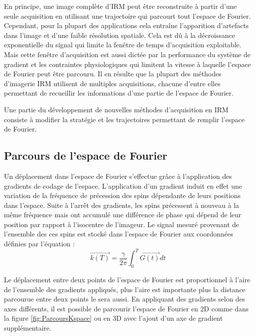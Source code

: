 En principe, une image complète d'IRM peut être reconstruite à partir d'une seule acquisition en utilisant une trajectoire qui  parcourt tout l'espace de Fourier. Cependant, pour la plupart des applications cela entraîne l'apparition d'artefacts dans l'image et d'une faible résolution spatiale. Cela est dû à la décroissance exponentielle du signal qui limite la fenêtre de temps d'acquisition exploitable. Mais cette fenêtre d'acquisition est aussi dictée par la performance du système de gradient et les contraintes physiologiques qui limitent la vitesse à laquelle l'espace de Fourier peut être parcouru. Il en résulte que la plupart des méthodes d'imagerie IRM utilisent de multiples acquisitions, chacune d'entre elles permettant de recueillir les informations d'une partie de l'espace de Fourier.

Une partie du développement de nouvelles méthodes d'acquisition en IRM consiste à modifier la stratégie et les trajectoires permettant de remplir l'espace de Fourier.


\subsection{Parcours de l'espace de Fourier}
\label{subsec:Parcours}

Un déplacement dans l'espace de Fourier s'effectue grâce à l'application des gradients de codage de l'espace. L'application d'un gradient induit en effet une variation de la fréquence de précession des spins dépendante de leurs positions dans l'espace. Suite à l'arrêt des gradients, les spins précessent à nouveau à la même fréquence mais ont accumulé une différence de phase qui dépend de leur position par rapport à l'isocentre de l'imageur. Le signal mesuré provenant de l'ensemble des ces spins est stocké dans l'espace de Fourier aux coordonnées définies par l'équation :
\begin{equation}
\overrightarrow{k(T)}= \frac{\gamma}{2\pi} \int_0^T \overrightarrow{G(t)}dt
\end{equation}

Le déplacement entre deux points de l'espace de Fourier est proportionnel à l'aire de l'ensemble des gradients appliqués, plus l'aire est importante plus la distance parcourue entre deux points le sera aussi. En appliquant des gradients selon des axes différents, il est possible de parcourir l'espace de Fourier en 2D comme dans la figure \ref{fig:ParcoursKspace} ou en 3D avec l'ajout d'un axe de gradient supplémentaire.

